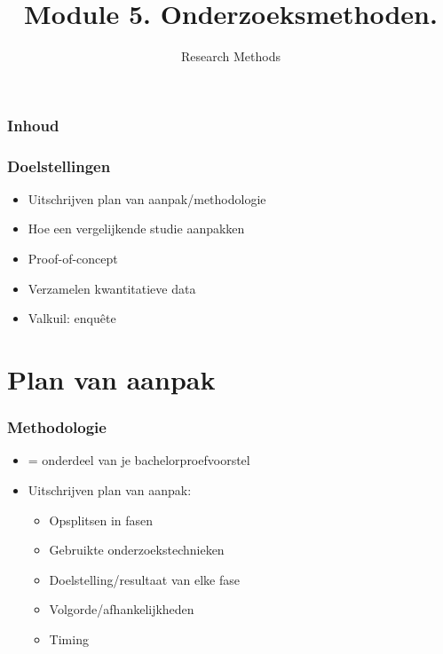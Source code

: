 \documentclass[aspectratio=169]{beamer}
\title{Module 5. Onderzoeksmethoden.}
\subtitle{Research Methods}
\author{\lecturers}   %
\date{\academicyear}
\begin{document}
\begin{frame}
  \maketitle
\end{frame}

\begin{frame}
  \frametitle{Inhoud}

  \tableofcontents
\end{frame}

\begin{frame}
  \frametitle{Doelstellingen}

  \begin{itemize}
    \item Uitschrijven plan van aanpak/methodologie
    \item Hoe een vergelijkende studie aanpakken
    \item Proof-of-concept
    \item Verzamelen kwantitatieve data
    \item Valkuil: enquête
  \end{itemize}

\end{frame}

\section{Plan van aanpak}

\begin{frame}
  \frametitle{Methodologie}

  \begin{itemize}
    \item = onderdeel van je bachelorproefvoorstel
    \item Uitschrijven plan van aanpak:
    \begin{itemize}
      \item Opsplitsen in fasen
      \item Gebruikte onderzoekstechnieken
      \item Doelstelling/resultaat van elke fase
      \item Volgorde/afhankelijkheden
      \item Timing
    \end{itemize}
  \end{itemize}


\end{frame}
\end{document}
